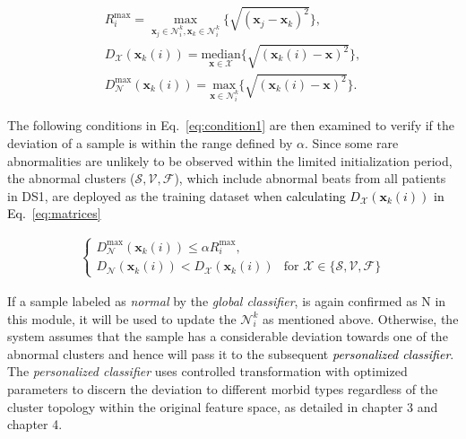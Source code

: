 \begin{align}
R_i^{\max}=\underset{\mathbf{x}_j\in\mathcal{N}_i^k,\mathbf{x}_k\in\mathcal{N}_i^k}{\max}\{\sqrt{(\mathbf{x}_j-\mathbf{x}_k)^2}\},\\
\label{eq:matrices}
D_\mathcal{X}(\mathbf{x}_k(i))=\underset{\mathbf{x} \in\mathcal{X}}{\text{median}}\{\sqrt{(\mathbf{x}_k(i)-\mathbf{x})^2}\},
\\
D_\mathcal{N}^{\max}(\mathbf{x}_k(i))=\underset{\mathbf{x} \in\mathcal{N}_i^k}{\text{max}}\{\sqrt{(\mathbf{x}_k(i)-\mathbf{x})^2}\}.
\end{align}

The following conditions in Eq.~\ref{eq:condition1} are then examined to verify if the deviation of a sample is within the range defined by $\alpha$. Since some rare abnormalities are unlikely to be observed within the limited initialization period, the abnormal clusters (${\mathcal{S},\mathcal{V},\mathcal{F}}$), which include abnormal beats from all patients in DS1, are deployed as the training dataset when \textcolor{black}{calculating $D_\mathcal{X}(\mathbf{x}_k(i))$ in Eq.~\ref{eq:matrices}} %

\begin{align}\label{eq:condition1}
\begin{cases}
D_\mathcal{N}^{\max}(\mathbf{x}_k(i))  \leq\alpha R_i^{\max},\\
D_\mathcal{N}(\mathbf{x}_k(i)) < D_\mathcal{X}(\mathbf{x}_k(i)) &\text{for~} \mathcal{X}\in\{\mathcal{S},\mathcal{V},\mathcal{F}\}   %
\end{cases}
\end{align}

If a sample labeled as \textit{normal} by the \textit{global classifier}, is again confirmed as N in this module, it will be used to update the $\mathcal{N}_i^k$ as mentioned above. Otherwise, the system assumes that the sample has a considerable deviation towards one of the abnormal clusters and hence will pass it to the subsequent \textcolor{black}{\textit{personalized classifier}}. The \textit{personalized classifier} uses controlled transformation with optimized parameters to discern the deviation to different morbid types regardless of the cluster topology within the original feature space, as detailed in chapter 3 and chapter 4. 

